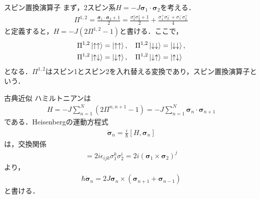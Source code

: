 \documentclass[../main.tex]{subfiles}
\begin{document}
\begin{frame}{スピン置換演算子}
    まず，2スピン系$H = -J\bm{\sigma}_1 \cdot \bm{\sigma}_2$を考える．
    \begin{align}
        \Pi^{1,2} = \frac{\bm{\sigma}_1\cdot \bm{\sigma}_2 + 1}{2}
        = \frac{\sigma_1^z\sigma_2^z + 1}{2}
        + \frac{\sigma_1^+\sigma_2^- + \sigma_1^-\sigma_2^+}{4}
    \end{align}
    と定義すると，$H = -J(2\Pi^{1,2}-1)$と書ける．ここで，
    \begin{align*}
        &
        \Pi^{1,2} \ket{\uparrow\uparrow} = \ket{\uparrow\uparrow},
        \quad
        \Pi^{1,2} \ket{\downarrow\downarrow} = \ket{\downarrow\downarrow},
        \\ &
        \Pi^{1,2} \ket{\uparrow\downarrow} = \ket{\downarrow\uparrow},
        \quad
        \Pi^{1,2} \ket{\downarrow\uparrow} = \ket{\uparrow \downarrow}
    \end{align*}
    となる．$\Pi^{1,2}$はスピン1とスピン2を入れ替える変換であり，スピン置換演算子という．
\end{frame}

\begin{frame}{古典近似}
    ハミルトニアンは
    \begin{align}
        H = -J \sum_{n=1}^N (2\Pi^{n,n+1} - 1) = -J \sum_{n=1}^N \bm{\sigma}_n\cdot \bm{\sigma}_{n+1}
    \end{align}
    である．Heisenbergの運動方程式
    \begin{align}
        \dot{\bm{\sigma}}_n = \frac{i}{\hbar}[H, \bm{\sigma}_n]
    \end{align}
    は，交換関係
    \begin{align}
        [\sigma_1^i\sigma_2^i, \sigma_1^j] = 2i\epsilon_{ijk}\sigma_1^k \sigma_2^i = 2i(\bm{\sigma}_1 \times \bm{\sigma}_2)^j
    \end{align}
    より，
    \begin{align}
        \hbar \dot{\bm{\sigma}}_n = 2J \bm{\sigma}_n \times (\bm{\sigma}_{n+1} + \bm{\sigma}_{n-1})
    \end{align}
    と書ける．
\end{frame}
\end{document}
